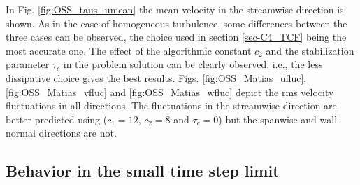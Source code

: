 In Fig. \ref{fig:OSS_taus_umean} the mean velocity in the streamwise direction is shown. As in the case of homogeneous turbulence, some differences between the three cases can be observed, the choice used in section \ref{sec-C4_TCF} being the most accurate one. The effect of the algorithmic constant $c_2$ and the stabilization parameter $\tau_c$ in the problem solution can be clearly observed, i.e., the less dissipative choice gives the best results.
Figs. \ref{fig:OSS_Matias_ufluc}, \ref{fig:OSS_Matias_vfluc} and \ref{fig:OSS_Matias_wfluc} depict the rms velocity fluctuations in all directions. The fluctuations in the streamwise direction are better predicted using ($c_1=12$, $c_2=8$ and $\tau_c=0$) but the spanwise and wall-normal directions are not.

\subsection{Behavior in the small time step limit}
\label{sec-C4_small_time_step}

